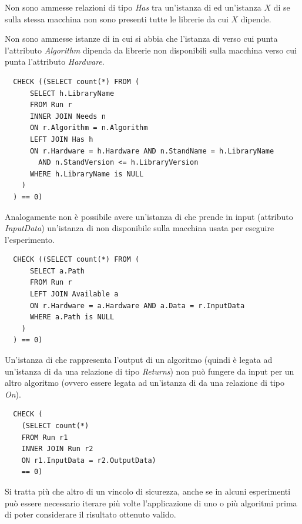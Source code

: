 \documentclass{article}
\begin{document}
Non sono ammesse relazioni di tipo \emph{Has} tra un'istanza di  ed un'istanza $X$ di  se sulla stessa macchina non sono presenti tutte le librerie da cui $X$ dipende.

Non sono ammesse istanze di  in cui si abbia che l'istanza di  verso cui punta l'attributo \emph{Algorithm} dipenda da librerie non disponibili sulla macchina verso cui punta l'attributo \emph{Hardware}.

\begin{verbatim}
  CHECK ((SELECT count(*) FROM (
      SELECT h.LibraryName
      FROM Run r
      INNER JOIN Needs n
      ON r.Algorithm = n.Algorithm
      LEFT JOIN Has h
      ON r.Hardware = h.Hardware AND n.StandName = h.LibraryName
        AND n.StandVersion <= h.LibraryVersion
      WHERE h.LibraryName is NULL
    )
  ) == 0)
\end{verbatim}

Analogamente non è possibile avere un'istanza di  che prende in input (attributo \emph{InputData}) un'istanza di  non disponibile sulla macchina usata per eseguire l'esperimento.

\begin{verbatim}
  CHECK ((SELECT count(*) FROM (
      SELECT a.Path
      FROM Run r
      LEFT JOIN Available a
      ON r.Hardware = a.Hardware AND a.Data = r.InputData
      WHERE a.Path is NULL
    )
  ) == 0)
\end{verbatim}

Un'istanza di  che rappresenta l'output di un algoritmo (quindi è legata ad un'istanza di  da una relazione di tipo \emph{Returns}) non può fungere da input per un altro algoritmo (ovvero essere legata ad un'istanza di  da una relazione di tipo \emph{On}).

\begin{verbatim}
  CHECK (
    (SELECT count(*)
    FROM Run r1
    INNER JOIN Run r2
    ON r1.InputData = r2.OutputData)
    == 0)
\end{verbatim}

Si tratta più che altro di un vincolo di sicurezza, anche se in alcuni esperimenti può essere necessario iterare più volte l'applicazione di uno o più algoritmi prima di poter considerare il risultato ottenuto valido.
\end{document}
